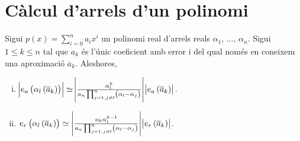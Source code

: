 \section{Càlcul d'arrels d'un polinomi}

\begin{prop}
  Sigui $p(x)=\sum\limits_{i=0}^{n} a_ix^i$ un polinomi real d'arrels reals $\alpha_1,\,\dots,\,\alpha_n$. Sigui $1\leq k\leq n$ tal que $a_k$ és l'únic coeficient amb error i del qual només en coneixem una aproximació $\overline{a}_k$. Aleshores,
  \begin{enumerate}[i)]
    \item $\abs{e_a\left( \alpha_l\left( \overline{a}_k\right) \right)} \simeq \abs{\frac{\alpha_l^k}{ a_n\prod_{j=1,j\neq l}^{n}\left( \alpha_l-\alpha_j\right) }}\abs{e_a\left( \overline{a}_k\right)}$.
    \item $e_r\left( \alpha_l\left( \overline{a}_k\right) \right) \simeq \left|\frac{a_k\alpha_l^{k-1}}{a_n\prod_{j=1,j\neq l}^{n}\left( \alpha_l-\alpha_j\right) }\right| \abs{e_r\left( \overline{a}_k\right)}$.
  \end{enumerate}
\end{prop}
